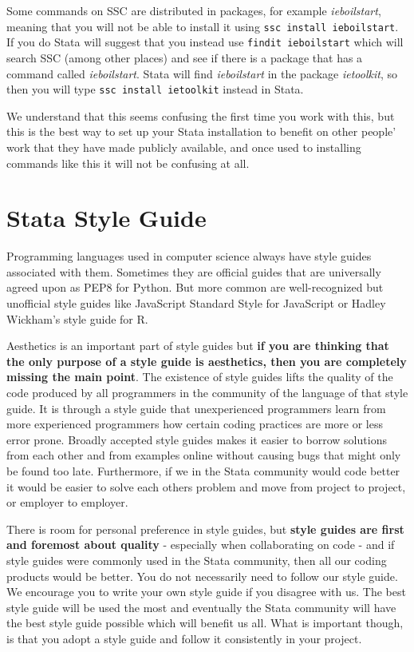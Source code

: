 Some commands on SSC are distributed in packages, for example \textit{ieboilstart}, meaning that you will 
not be able to install it using \verb+ssc install ieboilstart+. If you do Stata will suggest that you 
instead use \verb+findit ieboilstart+ which will search SSC (among other places) and see if there is a 
package that has a command called \textit{ieboilstart}. Stata will find \textit{ieboilstart} in the package 
\textit{ietoolkit}, so then you will type \verb+ssc install ietoolkit+ instead in Stata.

We understand that this seems confusing the first time you work with this, but this is the best way to set 
up your Stata installation to benefit on other people' work that they have made publicly available, and 
once used to installing commands like this it will not be confusing at all.


\section{Stata Style Guide}

Programming languages used in computer science always have style guides associated with them. Sometimes 
they are official guides that are universally agreed upon as PEP8 for 
Python. But more common are well-recognized but 
unofficial style guides like JavaScript Standard Style for 
JavaScript or Hadley Wickham's style guide for R.

Aesthetics is an important part of style guides but \textbf{if you are thinking that the only purpose of a 
style guide is aesthetics, then you are completely missing the main point}. The existence of style guides 
lifts the quality of the code produced by all programmers in the community of the language of that style 
guide. It is through a style guide that unexperienced programmers learn from more experienced programmers 
how certain coding practices are more or less error prone. Broadly accepted style guides makes it easier to 
borrow solutions from each other and from examples online without causing bugs that might only be found too 
late. Furthermore, if we in the Stata community would code better it would be easier to solve each others 
problem and move from project to project, or employer to employer.

There is room for personal preference in style guides, but \textbf{style guides are first and foremost 
about quality} - especially when collaborating on code - and if style guides were commonly used in the 
Stata community, then all our coding products would be better. You do not necessarily need to follow our 
style guide. We encourage you to write your own style guide if you disagree with us. The best style guide 
will be used the most and eventually the Stata community will have the best style guide possible which will 
benefit us all. What is important though, is that you adopt a style guide and follow it consistently in 
your project.



\mainmatter
